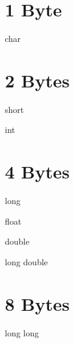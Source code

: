 \hypertarget{datatypes_byte1}{}\section{1 Byte}\label{datatypes_byte1}
\par
 char \hypertarget{datatypes_byte2}{}\section{2 Bytes}\label{datatypes_byte2}
short \par
 int \hypertarget{datatypes_byte3}{}\section{4 Bytes}\label{datatypes_byte3}
long \par
 float \par
 double \par
 long double \hypertarget{datatypes_byte8}{}\section{8 Bytes}\label{datatypes_byte8}
long long 